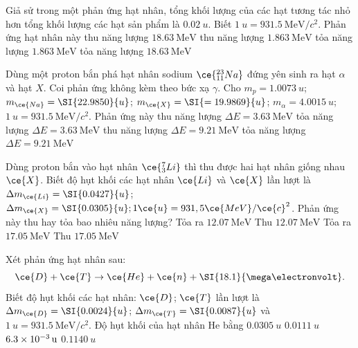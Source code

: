 \begin{ex}
	Giả sử trong một phản ứng hạt nhân, tổng khối lượng của các hạt tương tác nhỏ hơn tổng khối lượng các hạt sản phẩm là $\SI{0.02}{u}$. Biết $\SI{1}{u}=\SI{931.5}{\mega\electronvolt/c^2}$. Phản ứng hạt nhân này	
	\choice
	{\True thu năng lượng $\SI{18.63}{\mega\electronvolt}$}
	{thu năng lượng $\SI{1.863}{\mega\electronvolt}$}
	{tỏa năng lượng $\SI{1.863}{\mega\electronvolt}$}
	{tỏa năng lượng $\SI{18.63}{\mega\electronvolt}$}
\end{ex}

\begin{ex}
	Dùng một proton bắn phá hạt nhân sodium $\ce{_{11}^{23}Na}$ đứng yên sinh ra hạt $\alpha$ và hạt $X$. Coi phản ứng không kèm theo bức xạ $\gamma$. Cho $m_p=\SI{1.0073}{u}$; $m_{\ce{Na}}=\SI{22.9850}{u}$; $m_{\ce{X}}=\SI{=19.9869}{u}$; $m_\alpha=\SI{4.0015}{u}$; $\SI{1}{u}=\SI{931.5}{\mega\electronvolt/c^2}$. Phản ứng này	
	\choice
	{thu năng lượng $\Delta E=\SI{3.63}{\mega\electronvolt}$}
	{\True tỏa năng lượng $\Delta E=\SI{3.63}{\mega\electronvolt}$}
	{thu năng lượng $\Delta E=\SI{9.21}{\mega\electronvolt}$}
	{tỏa năng lượng $\Delta E=\SI{9.21}{\mega\electronvolt}$}
\end{ex}
\begin{ex}
	Dùng proton bắn vào hạt nhân $\ce{_3^7Li}$ thì thu được hai hạt nhân giống nhau $\ce{X}$. Biết độ hụt khối các hạt nhân $\ce{Li}$ và $\ce{X}$ lần lượt là $\Delta m_{\ce{Li}}=\SI{0.0427}{u}$; $\Delta m_{\ce{X}}=\SI{0.0305}{u}; 1 \ce{u}=931,5 \ce{MeV} / \ce{c}^2$. Phản ứng này thu hay tỏa bao nhiêu năng lượng?
	\choice
	{Tỏa ra $\SI{12.07}{\mega\electronvolt}$}
	{Thu $\SI{12.07}{\mega\electronvolt}$}
	{\True Tỏa ra $\SI{17.05}{\mega\electronvolt}$}
	{Thu $\SI{17.05}{\mega\electronvolt}$}
\end{ex}
\begin{ex}
	Xét phản ứng hạt nhân sau: 
	$$\ce{D}+\ce{T} \rightarrow \ce{He}+\ce{n}+\SI{18.1}{\mega\electronvolt}.$$
	Biết độ hụt khối các hạt nhân: $\ce{D}$; $\ce{T}$ lần lượt là $\Delta m_{\ce{D}}=\SI{0.0024}{u}$; $\Delta m_{\ce{T}}=\SI{0.0087}{u}$ và $\SI{1}{u}=\SI{931.5}{\mega\electronvolt/c^2}$. Độ hụt khối của hạt nhân He bằng
	\choice
	{\True $\SI{0.0305}{u}$}
	{$\SI{0.0111}{u}$}
	{$\SI{6.3E-3}{u}$}
	{$\SI{0.1140}{u}$}
\end{ex}
